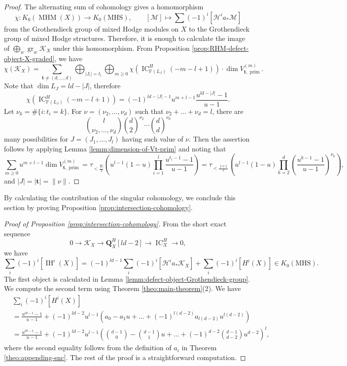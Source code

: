 \documentclass[letterpaper,11pt]{amsart}
\theoremstyle{plain}
\theoremstyle{definition}
\theoremstyle{remark}
\newcommand{\PP}{\mathbb{P}}
\newcommand{\QQ}{\mathbf{Q}}
\newcommand{\cH}{\mathcal{H}}
\newcommand{\cK}{\mathcal{K}}
\newcommand{\cM}{\mathcal{M}}
\newcommand{\uind}[1]{^{(#1)}}
\newcommand{\lsta}{_{*}}
\newcommand{\norm}[1]{\|#1\|}
\DeclareMathOperator{\gr}{gr}
\DeclareMathOperator{\prim}{prim}
\DeclareMathOperator{\IC}{IC}
\DeclareMathOperator{\IH}{IH}
\DeclareMathOperator{\MHM}{MHM}
\newcommand{\bft}{\mathbf{t}}
\begin{document}
    \begin{proof}
        The alternating sum of cohomology gives a homomorphism 
        $$\chi \colon K_{0}(\MHM(X)) \to K_{0}(\mathrm{MHS}), \qquad [\cM] \mapsto \sum (-1)^{i} [\cH^{i} a\lsta \cM ]$$
        from the Grothendieck group of mixed Hodge modules on $X$ to the Grothendieck group of mixed Hodge structures. Therefore, it is enough to calculate the image of $\bigoplus_{w} \gr_{w} \cK_{X}$ under this homomorphism. From Proposition \ref{prop:RHM-defect-object-X-graded}, we have
        $$ \chi (\cK_{X}) = \sum_{\bft \neq (d,\ldots, d)} \bigoplus_{|J_{i}| = t_{i}} \bigoplus_{m\geq 0} \chi\left(\IC_{\PP(L_{J})}^{H}(-m-l+1)\right)\cdot \dim V_{\bft, \prim}\uind{m}.$$
        Note that $\dim L_{J} = ld - |J|$, therefore $$\chi\left(\IC_{\PP(L_{J})}^{H}(-m-l+1)\right) = (-1)^{ld- |J|-1}u^{m+l-1}\frac{u^{ld -|J|}-1}{u-1}.$$
        Let $\nu_{k} = \#\{ i : t_{i} = k\}$. For $\nu = (\nu_{2},\ldots, \nu_{d})$ such that $\nu_{2} + \ldots + \nu_{d} = l$, there are
        $${l \choose \nu_{2},\ldots, \nu_{d}} {d \choose 2}^{\nu_{2}} \cdots {d \choose d}^{\nu_{d}}$$
        many possibilities for $J = (J_{1},\ldots, J_{l})$ having such value of $\nu$. Then the assertion follows by applying Lemma \ref{lemm:dimension-of-Vt-prim} and noting that
        $$ \sum_{m\geq 0} u^{m+l-1} \dim V_{\bft, \prim}\uind{m} = \tau_{<\frac{|\bft|}{2}} \left( u^{l-1} (1-u) \prod_{i=1}^{l} \frac{u^{t_{i}-1}-1}{u-1} \right) = \tau_{<\frac{\norm{\nu}}{2}} \left( u^{l-1} (1-u) \prod_{k=2}^{d} \left( \frac{u^{k-1}-1}{u-1} \right)^{\nu_{k}} \right), $$
        and $|J| = |\bft| = \norm{\nu}$.
    \end{proof}

    By calculating the contribution of the singular cohomology, we conclude this section by proving Proposition \ref{prop:intersection-cohomology}.

    \begin{proof}[Proof of Proposition \ref{prop:intersection-cohomology}]
        From the short exact sequence
        $$ 0 \to \cK_{X} \to \QQ_{X}^{H}[ld-2] \to \IC_{X}^{H} \to 0,$$
        we have
        $$ \sum_{i} (-1)^{i} [\IH^{i}(X)] = (-1)^{ld- 1} \sum_{i} (-1)^{i} [\cH^{i} a\lsta \cK_{X}] + \sum_{i} (-1)^{i} [H^{i}(X)] \in K_{0}(\mathrm{MHS}).$$
        The first object is calculated in Lemma \ref{lemm:defect-object-Grothendieck-group}. We compute the second term using Theorem \ref{theo:main-theorem}(2). We have
        \begin{align*}
            &\sum_{i} (-1)^{i} [H^{i}(X)] \\
            & = \frac{u^{ld-1}-1}{u-1} + (-1)^{ld-2} u^{l-1} (a_{0} - a_{1}u + \ldots + (-1)^{l(d-2)} a_{l(d-2)}u^{l(d-2)}) \\
            & = \frac{u^{ld-1}-1}{u-1} + (-1)^{ld-2} u^{l-1} \left( {d-1 \choose 0} - {d-1 \choose 1} u + \ldots + (-1)^{d-2} {d-1 \choose d-2} u^{d-2} \right)^{l},
        \end{align*}
        where the second equality follows from the definition of $a_{i}$ in Theorem \ref{theo:appending-snc}. The rest of the proof is a straightforward computation.
    \end{proof}
    
\end{document}
